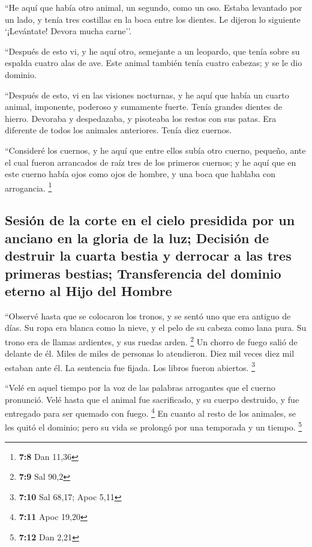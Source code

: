 \begin{paracol}{2}
 ``He aquí que había otro animal, un segundo, como un oso.
Estaba levantado por un lado, y tenía tres costillas en la boca entre
los dientes. Le dijeron lo siguiente `¡Levántate! Devora mucha carne''.

 ``Después de esto vi, y he aquí otro, semejante a un
leopardo, que tenía sobre su espalda cuatro alas de ave. Este animal
también tenía cuatro cabezas; y se le dio dominio.

 ``Después de esto, vi en las visiones nocturnas, y he
aquí que había un cuarto animal, imponente, poderoso y sumamente fuerte.
Tenía grandes dientes de hierro. Devoraba y despedazaba, y pisoteaba los
restos con sus patas. Era diferente de todos los animales anteriores.
Tenía diez cuernos.

 ``Consideré los cuernos, y he aquí que entre ellos subía
otro cuerno, pequeño, ante el cual fueron arrancados de raíz tres de los
primeros cuernos; y he aquí que en este cuerno había ojos como ojos de
hombre, y una boca que hablaba con arrogancia. \footnote{\textbf{7:8}
  Dan 11,36}

\hypertarget{sesiuxf3n-de-la-corte-en-el-cielo-presidida-por-un-anciano-en-la-gloria-de-la-luz-decisiuxf3n-de-destruir-la-cuarta-bestia-y-derrocar-a-las-tres-primeras-bestias-transferencia-del-dominio-eterno-al-hijo-del-hombre}{%
\subsection{Sesión de la corte en el cielo presidida por un anciano en
la gloria de la luz; Decisión de destruir la cuarta bestia y derrocar a
las tres primeras bestias; Transferencia del dominio eterno al Hijo del
Hombre}\label{sesiuxf3n-de-la-corte-en-el-cielo-presidida-por-un-anciano-en-la-gloria-de-la-luz-decisiuxf3n-de-destruir-la-cuarta-bestia-y-derrocar-a-las-tres-primeras-bestias-transferencia-del-dominio-eterno-al-hijo-del-hombre}}

 ``Observé hasta que se colocaron los tronos, y se sentó
uno que era antiguo de días. Su ropa era blanca como la nieve, y el pelo
de su cabeza como lana pura. Su trono era de llamas ardientes, y sus
ruedas arden. \footnote{\textbf{7:9} Sal 90,2}  Un chorro
de fuego salió de delante de él. Miles de miles de personas lo
atendieron. Diez mil veces diez mil estaban ante él. La sentencia fue
fijada. Los libros fueron abiertos. \footnote{\textbf{7:10} Sal 68,17;
  Apoc 5,11}

 ``Velé en aquel tiempo por la voz de las palabras
arrogantes que el cuerno pronunció. Velé hasta que el animal fue
sacrificado, y su cuerpo destruido, y fue entregado para ser quemado con
fuego. \footnote{\textbf{7:11} Apoc 19,20}  En cuanto al
resto de los animales, se les quitó el dominio; pero su vida se prolongó
por una temporada y un tiempo. \footnote{\textbf{7:12} Dan 2,21}


\end{paracol}

